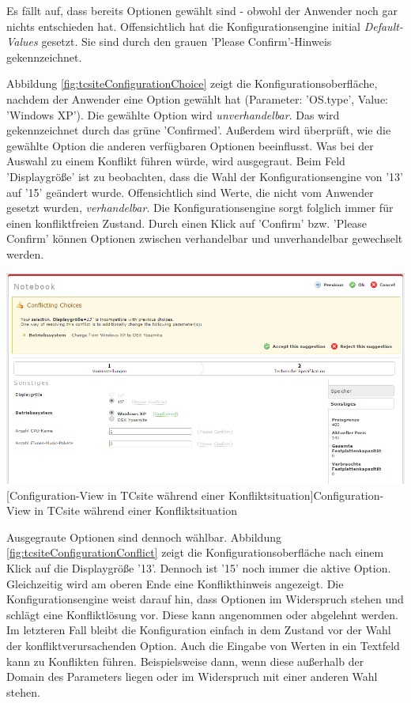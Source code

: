 \documentclass[11pt, a4paper, titlepage, listof=totoc, bibliography=totoc, index=totoc, twoside, openright, headings=normal]{scrreprt}
\begin{document}
Es fällt auf, dass bereits Optionen gewählt sind - obwohl der Anwender noch gar nichts entschieden hat. Offensichtlich hat die Konfigurationsengine initial \emph{Default-Values} gesetzt. Sie sind durch den grauen 'Please Confirm'-Hinweis gekennzeichnet.

Abbildung \ref{fig:tcsiteConfigurationChoice} zeigt die Konfigurationsoberfläche, nachdem der Anwender eine Option gewählt hat (Parameter: 'OS.type', Value: 'Windows XP'). Die gewählte Option wird \emph{unverhandelbar}. Das wird gekennzeichnet durch das grüne 'Confirmed'. Außerdem wird überprüft, wie die gewählte Option die anderen verfügbaren Optionen beeinflusst. Was bei der Auswahl zu einem Konflikt führen würde, wird ausgegraut. Beim Feld 'Displaygröße' ist zu beobachten, dass die Wahl der Konfigurationsengine von '13' auf '15' geändert wurde. Offensichtlich sind Werte, die nicht vom Anwender gesetzt wurden, \emph{verhandelbar}. Die Konfigurationsengine sorgt folglich immer für einen konfliktfreien Zustand. Durch einen Klick auf 'Confirm' bzw. 'Please Confirm' können Optionen zwischen verhandelbar und unverhandelbar gewechselt werden.

\vspace{1em}
\begin{minipage}{\linewidth}
	\centering
	\includegraphics[width=1\linewidth]{Abbildungen/tcsiteConfigurationConflict.PNG}
	[Configuration-View in TCsite während einer Konfliktsituation]{Configuration-View in TCsite während einer Konfliktsituation}
	\label{fig:tcsiteConfigurationConflict}
\end{minipage}
\vspace{0.3em}

Ausgegraute Optionen sind dennoch wählbar. Abbildung \ref{fig:tcsiteConfigurationConflict} zeigt die Konfigurationsoberfläche nach einem Klick auf die Displaygröße '13'. Dennoch ist '15' noch immer die aktive Option. Gleichzeitig wird am oberen Ende eine Konflikthinweis angezeigt. Die Konfigurationsengine weist darauf hin, dass Optionen im Widerspruch stehen und schlägt eine Konfliktlösung vor. Diese kann angenommen oder abgelehnt werden. Im letzteren Fall bleibt die Konfiguration einfach in dem Zustand vor der Wahl der konfliktverursachenden Option. Auch die Eingabe von Werten in ein Textfeld kann zu Konflikten führen. Beispielsweise dann, wenn diese außerhalb der Domain des Parameters liegen oder im Widerspruch mit einer anderen Wahl stehen. 
\end{document}
